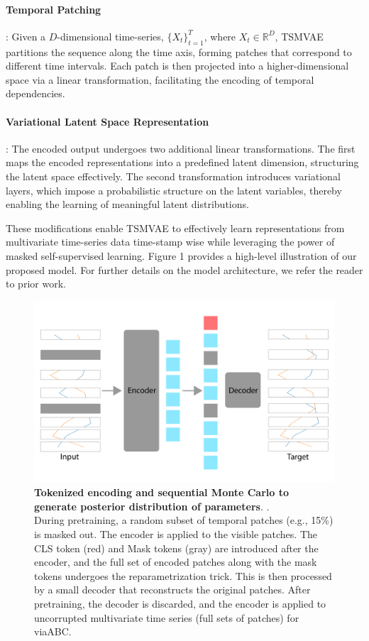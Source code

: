 \documentclass[12pt]{article} %
\newcommand{\para}[1]{\vspace*{-4.5mm}\paragraph{#1}}
\newcommand{\blue}[1]{{\color{magenta}{#1}}}
\begin{document}
\para{Temporal Patching}: Given a $D$-dimensional time-series, $\{X_t\}_{t=1}^{T}$, where $X_t \in \mathbb{R}^D$, TSMVAE partitions the sequence along the time axis, forming patches that correspond to different time intervals. Each patch is then projected into a higher-dimensional space via a linear transformation, facilitating the encoding of temporal dependencies.

\para{Variational Latent Space Representation}: The encoded output undergoes two additional linear transformations. The first maps the encoded representations into a predefined latent dimension, structuring the latent space effectively. The second transformation introduces variational layers, which impose a probabilistic structure on the latent variables, thereby enabling the learning of meaningful latent distributions. 

These modifications enable TSMVAE to effectively learn representations from multivariate time-series data time-stamp wise while leveraging the power of masked self-supervised learning. Figure 1 provides a high-level illustration of our proposed model. For further details on the model architecture, we refer the reader to prior work.

\begin{figure}
    \centering
    \includegraphics[width=0.75\linewidth]{figures/model_architecture.png}
    \caption{\textbf{Tokenized encoding and sequential Monte Carlo to generate posterior distribution of parameters}.
\blue{this figure will be the full schematic of VIA-ABC}. \\    
During pretraining, a random subset of temporal patches (e.g., 15\%) is masked out. The encoder is applied to the visible patches. The CLS token (red) and Mask tokens (gray) are introduced after the encoder, and the full set of encoded patches along with the mask tokens undergoes the reparametrization trick. This is then processed by a small decoder that reconstructs the original patches. After pretraining, the decoder is discarded, and the encoder is applied to uncorrupted multivariate time series (full sets of patches) for viaABC.}
    \label{fig:enter-label}
\end{figure}
\end{document}
